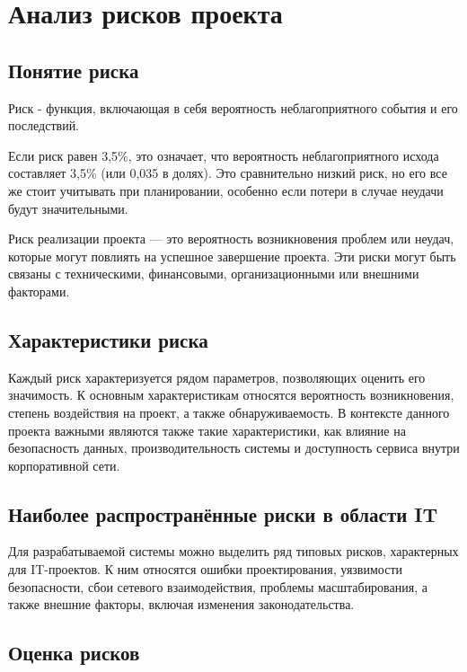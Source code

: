 \documentclass[14pt,a4paper]{extarticle}
\begin{document}
\section{Анализ рисков проекта}

\subsection{Понятие риска}

Риск - функция, включающая в себя вероятность неблагоприятного события и его последствий.

Если риск равен 3,5\%, это означает, что вероятность неблагоприятного исхода составляет 3,5\% (или 0,035 в долях). Это сравнительно низкий риск, но его все же стоит учитывать при планировании, особенно если потери в случае неудачи будут значительными.

Риск реализации проекта — это вероятность возникновения проблем или неудач, которые могут повлиять на успешное завершение проекта. Эти риски могут быть связаны с техническими, финансовыми, организационными или внешними факторами.

\subsection{Характеристики риска}

Каждый риск характеризуется рядом параметров, позволяющих оценить его значимость. К основным характеристикам относятся вероятность возникновения, степень воздействия на проект, а также обнаруживаемость. В контексте данного проекта важными являются также такие характеристики, как влияние на безопасность данных, производительность системы и доступность сервиса внутри корпоративной сети.

\subsection{Наиболее распространённые риски в области IT}

Для разрабатываемой системы можно выделить ряд типовых рисков, характерных для IT-проектов. К ним относятся ошибки проектирования, уязвимости безопасности, сбои сетевого взаимодействия, проблемы масштабирования, а также внешние факторы, включая изменения законодательства.

\subsection{Оценка рисков}
\end{document}
